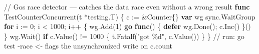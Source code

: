 \documentclass[11pt]{article}
\newenvironment{Shaded}{\begin{snugshade}}{\end{snugshade}}
\newcommand{\CommentTok}[1]{\textcolor[rgb]{0.48,0.49,0.49}{#1}}
\newcommand{\ControlFlowTok}[1]{\textcolor[rgb]{0.99,0.74,0.29}{\textbf{#1}}}
\newcommand{\DecValTok}[1]{\textcolor[rgb]{0.96,0.45,0.00}{#1}}
\newcommand{\KeywordTok}[1]{\textcolor[rgb]{0.81,0.81,0.76}{\textbf{#1}}}
\newcommand{\NormalTok}[1]{\textcolor[rgb]{0.81,0.81,0.76}{#1}}
\newcommand{\OperatorTok}[1]{\textcolor[rgb]{0.81,0.81,0.76}{#1}}
\newcommand{\StringTok}[1]{\textcolor[rgb]{0.96,0.31,0.31}{#1}}
\begin{document}
\begin{Shaded}
\begin{Highlighting}[]
\CommentTok{// Go\textquotesingle{}s race detector — catches the data race even without a wrong result}
\KeywordTok{func}\NormalTok{ TestCounterConcurrent}\OperatorTok{(}\NormalTok{t }\OperatorTok{*}\NormalTok{testing}\OperatorTok{.}\NormalTok{T}\OperatorTok{)} \OperatorTok{\{}
\NormalTok{    c }\OperatorTok{:=} \OperatorTok{\&}\NormalTok{Counter}\OperatorTok{\{\}}
    \KeywordTok{var}\NormalTok{ wg sync}\OperatorTok{.}\NormalTok{WaitGroup}
    \ControlFlowTok{for}\NormalTok{ i }\OperatorTok{:=} \DecValTok{0}\OperatorTok{;}\NormalTok{ i }\OperatorTok{\textless{}} \DecValTok{1000}\OperatorTok{;}\NormalTok{ i}\OperatorTok{++} \OperatorTok{\{}
\NormalTok{        wg}\OperatorTok{.}\NormalTok{Add}\OperatorTok{(}\DecValTok{1}\OperatorTok{)}
        \ControlFlowTok{go} \KeywordTok{func}\OperatorTok{()} \OperatorTok{\{} \ControlFlowTok{defer}\NormalTok{ wg}\OperatorTok{.}\NormalTok{Done}\OperatorTok{();}\NormalTok{ c}\OperatorTok{.}\NormalTok{Inc}\OperatorTok{()} \OperatorTok{\}()}
    \OperatorTok{\}}
\NormalTok{    wg}\OperatorTok{.}\NormalTok{Wait}\OperatorTok{()}
    \ControlFlowTok{if}\NormalTok{ c}\OperatorTok{.}\NormalTok{Value}\OperatorTok{()} \OperatorTok{!=} \DecValTok{1000} \OperatorTok{\{}\NormalTok{ t}\OperatorTok{.}\NormalTok{Fatalf}\OperatorTok{(}\StringTok{"got \%d"}\OperatorTok{,}\NormalTok{ c}\OperatorTok{.}\NormalTok{Value}\OperatorTok{())} \OperatorTok{\}}
\OperatorTok{\}}
\CommentTok{// run:  go test {-}race    \textless{}{-} flags the unsynchronized write on c.count}
\end{Highlighting}
\end{Shaded}

\end{document}
